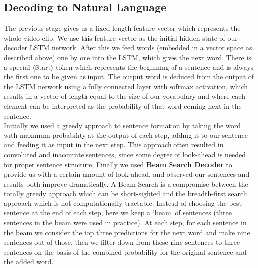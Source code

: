 \documentclass[12pt]{article}
\begin{document}
\subsection{Decoding to Natural Language}
The previous stage gives us a fixed length feature vector which represents the whole video clip. We use this feature vector as the initial hidden state of our decoder LSTM network. After this we feed words (embedded in a vector space as described above) one by one into the LSTM, which gives the next word. There is a special $\langle$Start$\rangle$ token which represents the beginning of a sentence and is always the first one to be given as input. The output word is deduced from the output of the LSTM network using a fully connected layer with softmax activation, which results in a vector of length equal to the size of our vocabulary and where each element can be interpreted as the probability of that word coming next in the sentence.\\
Initially we used a greedy approach to sentence formation by taking the word with maximum probability at the output of  each step, adding it to our sentence and feeding it as input in the next step. This approach often resulted in convoluted and inaccurate sentences, since some degree of look-ahead is needed for proper sentence structure. Finally we used \textbf{Beam Search Decoder} to provide us with a  certain amount of look-ahead, and observed our sentences and results both improve dramatically. A Beam Search is a compromise between the totally greedy approach which can be short-sighted and the breadth-first search approach which is not computationally tractable. Instead of choosing the best sentence at the end of each step, here we keep a  `beam' of sentences (three sentences in the beam were used in practice). At each step, for each sentence in the beam we consider the top three predictions for the next word and make nine sentences out of those, then we filter down from these nine sentences to three sentences on the basis of the combined probability for the original sentence and the added word.
\end{document}
